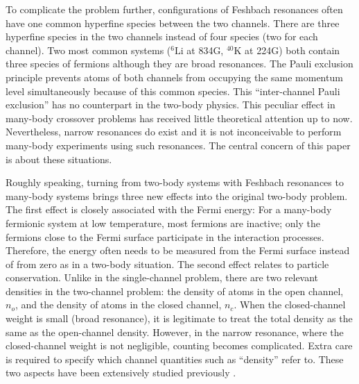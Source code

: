 \documentclass[reprint,pra]{revtex4-1}
\begin{document}

To complicate the problem  further,   configurations of Feshbach resonances often have one common hyperfine species between the two channels. There are three hyperfine species in the  two channels instead of four species (two for each channel).  Two most common systems (${}^{6}\text{Li}$ at 834G, $^{40}\text{K}$ at 224G) both contain three species of fermions although they are broad resonances.  The Pauli exclusion principle prevents  atoms of both channels from occupying the same momentum level simultaneously because of this common species.  This ``inter-channel Pauli exclusion'' has no counterpart in the two-body physics. This peculiar effect  in many-body crossover problems has  received little theoretical attention up to now.    Nevertheless,   narrow resonances do exist \cite{ChinRMP} and it is not  inconceivable to perform many-body experiments using such resonances.  The central concern of this paper is about these situations. 

Roughly speaking, turning from two-body systems with Feshbach resonances to many-body systems brings three new effects into the original two-body problem.  The first effect is closely associated with the Fermi energy:  For a many-body fermionic system at low temperature, most fermions are inactive; only the fermions close to the Fermi surface participate in the interaction processes. Therefore, the energy often needs to be measured from the Fermi surface instead of from zero as in a two-body situation. 
The second effect relates to  particle conservation. Unlike in the single-channel problem, there are two relevant densities in the two-channel problem: the density of atoms in the open channel, $n_{o}$, and the density of atoms in the closed channel, $n_{c}$. When the closed-channel weight is small (broad resonance), it is legitimate to treat the total density as the same as the open-channel density.  However, in the narrow resonance, where the closed-channel weight is not negligible, counting becomes complicated.  Extra care is required to specify which channel quantities such as ``density'' refer to.  These two aspects have been   extensively studied previously \cite{JacksonNarrow,GurarieNarrow}.
\end{document}
